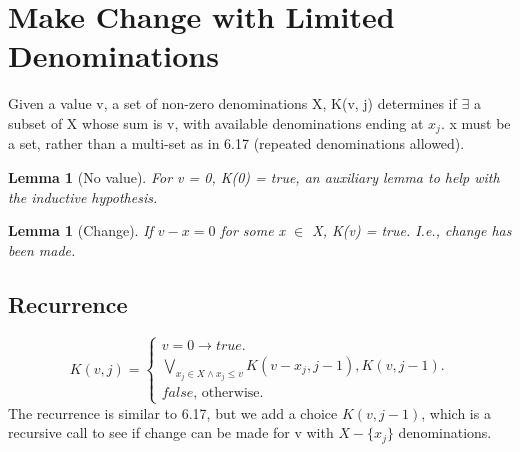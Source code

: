 \documentclass{article}
\newtheorem{lemma}[theorem]{Lemma}
\begin{document}
	
\section{Make Change with Limited Denominations}
Given a value v, a set of non-zero denominations X, K(v, j) determines if $\exists$ a subset of X whose sum is v, with available denominations ending at $x_j$. x must be a set, rather than a multi-set as in 6.17 (repeated denominations allowed).

\begin{lemma} [No value]
\label{bc1}	
For v = 0, K(0) = true, an auxiliary lemma to help with the inductive hypothesis.
\end{lemma}

\begin{lemma} [Change]
\label{bc2}	
If $v - x = 0$ for some x $\in$ X, K(v) = true. I.e., change has been made.
\end{lemma}

\subsection{Recurrence}
\begin{equation}
K(v,j)=			
\begin{cases}
v = 0 \to true.\\	
\underset{x_j \in X \land x_j \leq v}{\bigvee} K(v-x_j, j-1), K(v, j-1).\\
false \text{, otherwise.}
\end{cases}
\end{equation}
The recurrence is similar to 6.17, but we add a choice $K(v,j-1)$, which is a recursive call to see if change can be made for v with $X - \{x_j\}$ denominations.
\end{document}
